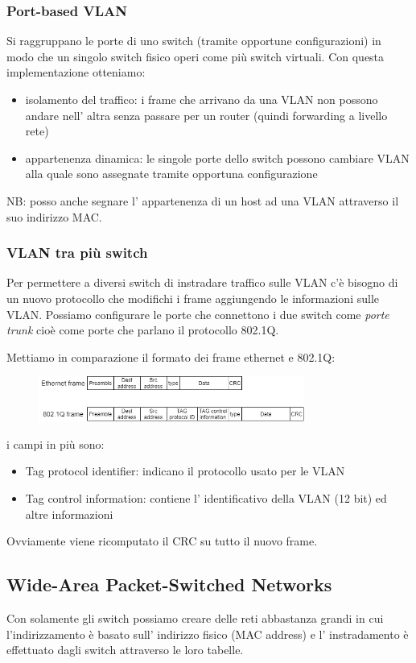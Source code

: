 \subsubsection{Port-based VLAN}
Si raggruppano le porte di uno switch (tramite opportune configurazioni) in modo che un singolo switch fisico operi come più switch virtuali.
Con questa implementazione otteniamo:
\begin{itemize}
    \item isolamento del traffico: i frame che arrivano da una VLAN non possono andare nell' altra senza passare per un router (quindi forwarding a livello rete)

    \item appartenenza dinamica: le singole porte dello switch possono cambiare VLAN alla quale sono assegnate tramite opportuna configurazione
\end{itemize}

NB: posso anche segnare l' appartenenza di un host ad una VLAN attraverso il suo indirizzo MAC.

\subsubsection{VLAN tra più switch}
Per permettere a diversi switch di instradare traffico sulle VLAN c'è bisogno di un nuovo protocollo che modifichi i frame aggiungendo le informazioni sulle VLAN.
Possiamo configurare le porte che connettono i due switch come \emph{porte trunk} cioè come porte che parlano il protocollo 802.1Q.

Mettiamo in comparazione il formato dei frame ethernet e 802.1Q:
\begin{figure}[H]
    \centering
    \includegraphics[width=330px]{images/4_Switched_Networks/802.1Q_frame.png}
\end{figure}
i campi in più sono:
\begin{itemize}
    \item Tag protocol identifier: indicano il protocollo usato per le VLAN
    \item Tag control information: contiene l' identificativo della VLAN (12 bit) ed altre informazioni
\end{itemize}
Ovviamente viene ricomputato il CRC su tutto il nuovo frame.

\subsection{Wide-Area Packet-Switched Networks}
Con solamente gli switch possiamo creare delle reti abbastanza grandi in cui l'indirizzamento è basato sull' indirizzo fisico (MAC address) e l' instradamento è effettuato dagli switch attraverso le loro tabelle.

